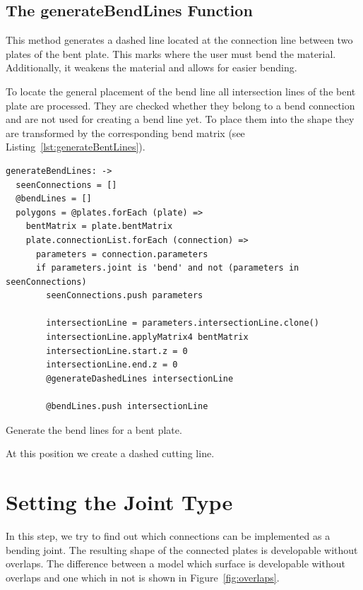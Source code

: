 \documentclass[../ClassicThesis.tex]{subfiles}
\begin{document}
\subsection{The generateBendLines Function}
\label{sec:generateBendLines}

This method generates a dashed line located at the connection line between two plates of the bent plate. This marks where the user must bend the material. Additionally, it weakens the material and allows for easier bending.

To locate the general placement of the bend line all intersection lines of the bent plate are processed. They are checked whether they belong to a bend connection and are not used for creating a bend line yet. To place them into the shape they are transformed by the corresponding bend matrix (see Listing~\ref{lst:generateBentLines}).

\begin{listing}[ht]
\begin{verbatim}
generateBendLines: ->
  seenConnections = []
  @bendLines = []
  polygons = @plates.forEach (plate) =>
    bentMatrix = plate.bentMatrix
    plate.connectionList.forEach (connection) =>
      parameters = connection.parameters
      if parameters.joint is 'bend' and not (parameters in seenConnections)
        seenConnections.push parameters

        intersectionLine = parameters.intersectionLine.clone()
        intersectionLine.applyMatrix4 bentMatrix
        intersectionLine.start.z = 0
        intersectionLine.end.z = 0
        @generateDashedLines intersectionLine

        @bendLines.push intersectionLine
\end{verbatim}
\caption{Generate the bend lines for a bent plate.}
\label{lst:bend-matrix}
\end{listing}

At this position we create a dashed cutting line.

\section{Setting the Joint Type}

In this step, we try to find out which connections can be implemented as a bending joint. The resulting shape of the connected plates is developable without overlaps. The difference between a model which surface is developable without overlaps and one which in not is shown in Figure~\ref{fig:overlaps}.
\end{document}
